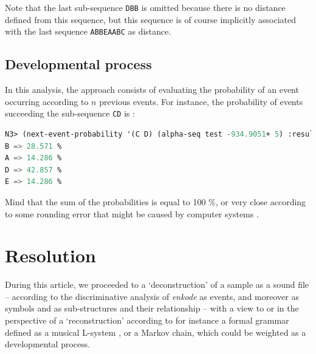 \smallskip

Note that the last sub-sequence \texttt{DBB} is omitted because there is no distance defined from this sequence, but this sequence is of course implicitly associated with the last sequence \texttt{ABBEAABC} as distance.

\subsection{Developmental process}

In this analysis, the approach consists of evaluating the probability of an event occurring according to $n$ previous events.
For instance, the probability of events succeeding the sub-sequence \texttt{CD} is :

\smallskip

\begin{lstlisting}[language=Lisp]
N3> (next-event-probability '(C D) (alpha-seq test -934.9051+ 5) :result :verbose)
B => 28.571 %
A => 14.286 %
D => 42.857 %
E => 14.286 %
\end{lstlisting}

\smallskip

Mind that the sum of the probabilities is equal to 100 \%,  or very close according to some rounding error that might be caused by computer systems \citep{re}.

\section{Resolution}
\label{mcres}

During this article, we proceeded to a `deconstruction' of a sample as a sound file -- according to the discriminative analysis of \textit{\textsl{enkode}} as events, and moreover as symbols and as sub-structures and their relationship -- with a view to or in the perspective of a `reconstruction' according to for instance a formal grammar defined as a musical L-system \citep{ml}, or a Markov chain, which could be weighted as a developmental process.

